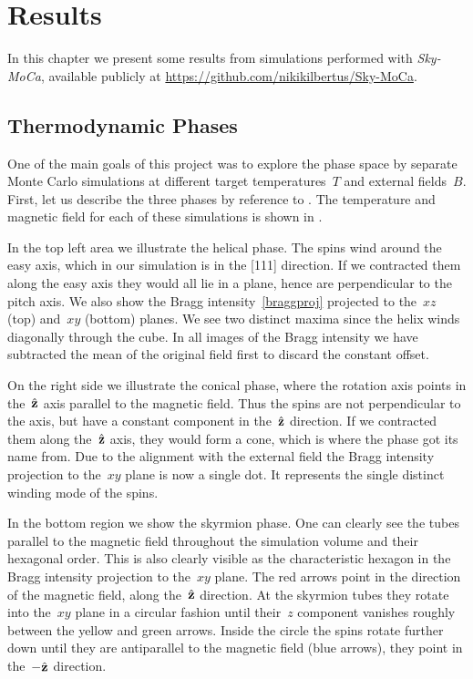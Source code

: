 %
\chapter{Results}\label{chap:2}
%
In this chapter we present some results from simulations performed with
\emph{Sky-MoCa}, available publicly at
\href{https://github.com/nikikilbertus/Sky-MoCa}{\textsf{https://github.com/nikikilbertus/Sky-MoCa}}.
%
\section{Thermodynamic Phases}\label{sec:phases}
%
One of the main goals of this project was to explore the phase space by separate
Monte Carlo simulations at different target temperatures~$T$ and external
fields~$B$. First, let us describe the three phases by reference to
. The temperature and magnetic field for each of these
simulations is shown in .

In the top left area we illustrate the helical phase. The spins wind around the
easy axis, which in our simulation is in the [111] direction.  If we contracted
them along the easy axis they would all lie in a plane, hence are perpendicular
to the pitch axis. We also show the Bragg intensity~\eqref{braggproj} projected
to the~$xz$ (top) and~$xy$ (bottom) planes. We see two distinct maxima since the
helix winds diagonally through the cube. In all images of the Bragg intensity we
have subtracted the mean of the original field first to discard the constant
offset.

On the right side we illustrate the conical phase, where the rotation axis
points in the~$\hat{\mathbf{z}}$ axis parallel to the magnetic field. Thus the spins are not
perpendicular to the axis, but have a constant component in the~$\hat{\mathbf{z}}$ direction.
If we contracted them along the~$\hat{\mathbf{z}}$ axis, they would form a cone, which is
where the phase got its name from. Due to the alignment with the external field
the Bragg intensity projection to the~$xy$ plane is now a single dot. It
represents the single distinct winding mode of the spins.

In the bottom region we show the skyrmion phase. One can clearly see the tubes
parallel to the magnetic field throughout the simulation volume and their
hexagonal order. This is also clearly visible as the characteristic hexagon in
the Bragg intensity projection to the~$xy$ plane. The red arrows point in the
direction of the magnetic field, \ie{} along the~$\hat{\mathbf{z}}$ direction. At the
skyrmion tubes they rotate into the~$xy$ plane in a circular fashion until
their~$z$ component vanishes roughly between the yellow and green arrows. Inside
the circle the spins rotate further down until they are antiparallel to the
magnetic field (blue arrows), \ie{} they point in the~$-\hat{\mathbf{z}}$ direction.

